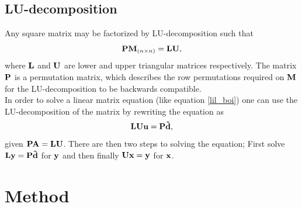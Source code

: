 \documentclass[notitlepage, reprint, nofootinbib]{revtex4-1}
\begin{document}
\subsection{LU-decomposition}
Any square matrix may be factorized by LU-decomposition such that 
\begin{equation}\label{LU}\vb{P}\vb{M}_{(n\times n)}=\vb{L}\vb{U},\end{equation}
where $\vb{L}$ and $\vb{U}$ are lower and upper triangular matrices respectively. The matrix $\vb{P}$ is a permutation matrix, which describes the row permutations required on $\vb{M}$ for the LU-decomposition to be backwards compatible. \\[2mm]
In order to solve a linear matrix equation (like equation \ref{lil_boi}) one can use the LU-decomposition of the matrix by rewriting the equation as
\begin{equation}\label{LU_lil_boi}\vb{L}\vb{U}\vb{u}=\vb{P}\vb{\tilde{d}},\end{equation}
given $\vb{P}\vb{A}=\vb{L}\vb{U}$. There are then two steps to solving the equation; First solve $\vb{L}\vb{y} = \vb{P}\vb{\tilde{d}}$ for $\vb{y}$ and then finally $\vb{U}\vb{x} =\vb{y}$ for $\vb{x}$. 

\section{Method}
\end{document}
